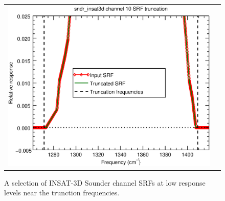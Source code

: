 \begin{figure}[H]
\begin{tabular}{c c}
    \includegraphics[scale=0.35]{graphics/sndr/trunc/sndr_insat3d-10.trunc.eps}
  \end{tabular}
  \caption{A selection of INSAT-3D Sounder channel SRFs at low response levels near the trunction frequencies.}
  \label{fig:sndr_selection_trunc}
\end{figure}


\clearpage




\begin{appendix}
  
  
  
  
\end{appendix}



